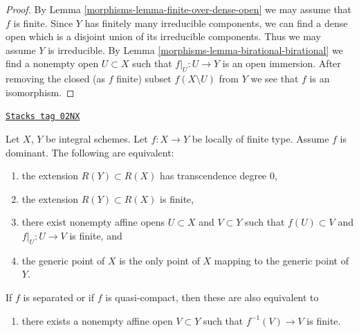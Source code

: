 \begin{proof}

By Lemma \ref{morphisms-lemma-finite-over-dense-open} we may assume that $f$ is finite.
Since $Y$ has finitely many irreducible components, we can find a dense
open which is a disjoint union of its irreducible components. Thus we may
assume $Y$ is irreducible. By Lemma \ref{morphisms-lemma-birational-birational} we find
a nonempty open $U \subset X$ such that $f|_U : U \to Y$ is an open immersion.
After removing the closed (as $f$ finite)
subset $f(X \setminus U)$ from $Y$ we see that $f$ is an isomorphism.
\end{proof}

\begin{lemma}
\label{morphisms-lemma-finite-degree}
\href{https://stacks.math.columbia.edu/tag/02NX}{\texttt{Stacks tag 02NX}}

Let $X$, $Y$ be integral schemes.
Let $f : X \to Y$ be locally of finite type.
Assume $f$ is dominant.
The following are equivalent:
\begin{enumerate}
\item the extension $R(Y) \subset R(X)$ has
transcendence degree $0$,
\item the extension $R(Y) \subset R(X)$ is finite,
\item there exist nonempty affine opens $U \subset X$
and $V \subset Y$ such that $f(U) \subset V$
and $f|_U : U \to V$ is finite, and
\item the generic point of $X$ is the only point of $X$ mapping to
the generic point of $Y$.
\end{enumerate}
If $f$ is separated or if $f$ is quasi-compact, then these are
also equivalent to
\begin{enumerate}
\item[(5)] there exists a nonempty affine open $V \subset Y$ such
that $f^{-1}(V) \to V$ is finite.
\end{enumerate}
\end{lemma}

